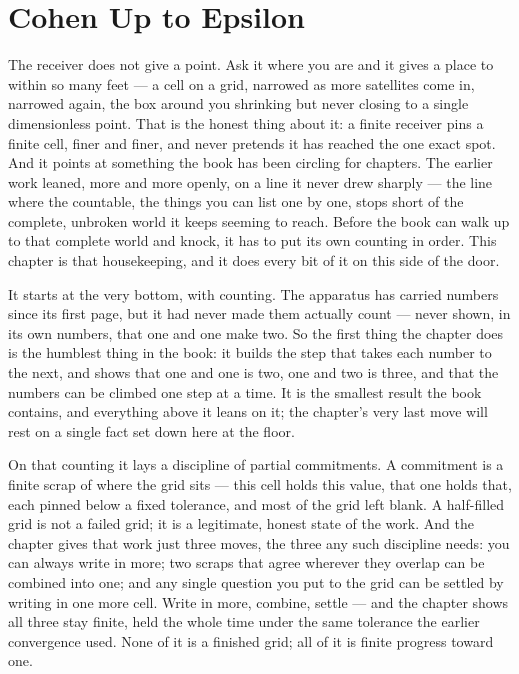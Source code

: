 \chapter{Cohen Up to Epsilon}

The receiver does not give a point. Ask it where you are and it gives a place to within so many feet --- a cell on a grid, narrowed as more satellites come in, narrowed again, the box around you shrinking but never closing to a single dimensionless point. That is the honest thing about it: a finite receiver pins a finite cell, finer and finer, and never pretends it has reached the one exact spot. And it points at something the book has been circling for chapters. The earlier work leaned, more and more openly, on a line it never drew sharply --- the line where the countable, the things you can list one by one, stops short of the complete, unbroken world it keeps seeming to reach. Before the book can walk up to that complete world and knock, it has to put its own counting in order. This chapter is that housekeeping, and it does every bit of it on this side of the door.

It starts at the very bottom, with counting. The apparatus has carried numbers since its first page, but it had never made them actually count --- never shown, in its own numbers, that one and one make two. So the first thing the chapter does is the humblest thing in the book: it builds the step that takes each number to the next, and shows that one and one is two, one and two is three, and that the numbers can be climbed one step at a time. It is the smallest result the book contains, and everything above it leans on it; the chapter's very last move will rest on a single fact set down here at the floor.

On that counting it lays a discipline of partial commitments. A commitment is a finite scrap of where the grid sits --- this cell holds this value, that one holds that, each pinned below a fixed tolerance, and most of the grid left blank. A half-filled grid is not a failed grid; it is a legitimate, honest state of the work. And the chapter gives that work just three moves, the three any such discipline needs: you can always write in more; two scraps that agree wherever they overlap can be combined into one; and any single question you put to the grid can be settled by writing in one more cell. Write in more, combine, settle --- and the chapter shows all three stay finite, held the whole time under the same tolerance the earlier convergence used. None of it is a finished grid; all of it is finite progress toward one.

